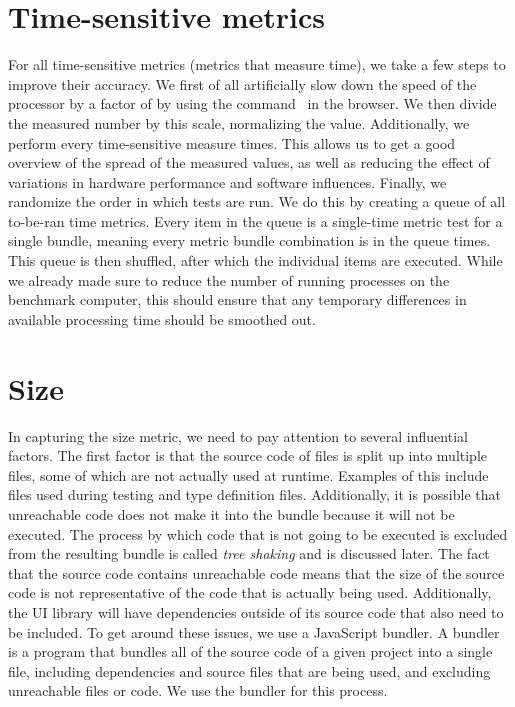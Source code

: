 \section{Time-sensitive metrics}\label{sec:experimental-setup:time-sensitive-metrics}
For all time-sensitive metrics (metrics that measure time), we take a few steps to improve their accuracy. We first of all artificially slow down the speed of the processor by a factor of \slowdownFactor{} by using the  command~ in the browser. We then divide the measured number by this scale, normalizing the value. Additionally, we perform every time-sensitive measure \numMeasures{} times. This allows us to get a good overview of the spread of the measured values, as well as reducing the effect of variations in hardware performance and software influences. Finally, we randomize the order in which tests are run. We do this by creating a queue of all to-be-ran time metrics. Every item in the queue is a single-time metric test for a single bundle, meaning every metric bundle combination is in the queue \numMeasures{} times. This queue is then shuffled, after which the individual items are executed. While we already made sure to reduce the number of running processes on the benchmark computer, this should ensure that any temporary differences in available processing time should be smoothed out.


\section{Size}\label{sec:experimental-setup:size}
In capturing the size metric, we need to pay attention to several influential factors. The first factor is that the source code of files is split up into multiple files, some of which are not actually used at runtime. Examples of this include files used during testing and type definition files. Additionally, it is possible that unreachable code does not make it into the bundle because it will not be executed. The process by which code that is not going to be executed is excluded from the resulting bundle is called \emph{tree shaking} and is discussed later. The fact that the source code contains unreachable code means that the size of the source code is not representative of the code that is actually being used. Additionally, the UI library will have dependencies outside of its source code that also need to be included. To get around these issues, we use a JavaScript bundler. A bundler is a program that bundles all of the source code of a given project into a single file, including dependencies and source files that are being used, and excluding unreachable files or code. We use the  bundler for this process.

